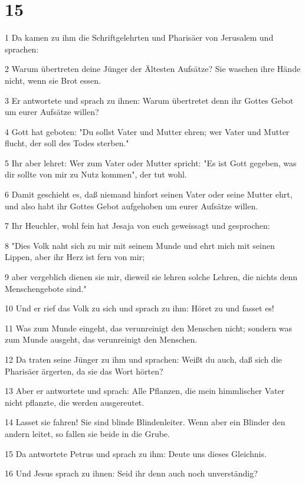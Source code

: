 \chapter{15}

\par 1 Da kamen zu ihm die Schriftgelehrten und Pharisäer von Jerusalem und sprachen:
\par 2 Warum übertreten deine Jünger der Ältesten Aufsätze? Sie waschen ihre Hände nicht, wenn sie Brot essen.
\par 3 Er antwortete und sprach zu ihnen: Warum übertretet denn ihr Gottes Gebot um eurer Aufsätze willen?
\par 4 Gott hat geboten: "Du sollst Vater und Mutter ehren; wer Vater und Mutter flucht, der soll des Todes sterben."
\par 5 Ihr aber lehret: Wer zum Vater oder Mutter spricht: "Es ist Gott gegeben, was dir sollte von mir zu Nutz kommen", der tut wohl.
\par 6 Damit geschieht es, daß niemand hinfort seinen Vater oder seine Mutter ehrt, und also habt ihr Gottes Gebot aufgehoben um eurer Aufsätze willen.
\par 7 Ihr Heuchler, wohl fein hat Jesaja von euch geweissagt und gesprochen:
\par 8 "Dies Volk naht sich zu mir mit seinem Munde und ehrt mich mit seinen Lippen, aber ihr Herz ist fern von mir;
\par 9 aber vergeblich dienen sie mir, dieweil sie lehren solche Lehren, die nichts denn Menschengebote sind."
\par 10 Und er rief das Volk zu sich und sprach zu ihm: Höret zu und fasset es!
\par 11 Was zum Munde eingeht, das verunreinigt den Menschen nicht; sondern was zum Munde ausgeht, das verunreinigt den Menschen.
\par 12 Da traten seine Jünger zu ihm und sprachen: Weißt du auch, daß sich die Pharisäer ärgerten, da sie das Wort hörten?
\par 13 Aber er antwortete und sprach: Alle Pflanzen, die mein himmlischer Vater nicht pflanzte, die werden ausgereutet.
\par 14 Lasset sie fahren! Sie sind blinde Blindenleiter. Wenn aber ein Blinder den andern leitet, so fallen sie beide in die Grube.
\par 15 Da antwortete Petrus und sprach zu ihm: Deute uns dieses Gleichnis.
\par 16 Und Jesus sprach zu ihnen: Seid ihr denn auch noch unverständig?

